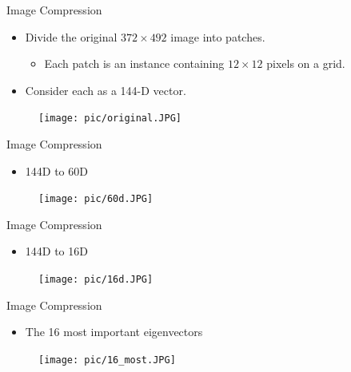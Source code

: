 \documentclass[serif, aspectratio=169]{beamer}
\begin{document}
\begin{frame}{Image Compression}
       \begin{itemize}
           \item Divide the original $372 \times 492$ image into patches.
\begin{itemize}
    \item Each patch is an instance containing $12 \times 12$ pixels on a grid.
\end{itemize}
            \item Consider each as a 144-D vector.
       \end{itemize}
        \begin{figure}[htpb]
            \begin{center}
                \texttt{[image: pic/original.JPG]}
            \end{center}
        \end{figure}
\end{frame}

\begin{frame}{Image Compression}
       \begin{itemize}
           \item 144D to 60D
       \end{itemize}
        \begin{figure}[htpb]
            \begin{center}
                \texttt{[image: pic/60d.JPG]}
            \end{center}
        \end{figure}
\end{frame}

\begin{frame}{Image Compression}
       \begin{itemize}
           \item 144D to 16D
       \end{itemize}
        \begin{figure}[htpb]
            \begin{center}
                \texttt{[image: pic/16d.JPG]}
            \end{center}
        \end{figure}
\end{frame}


\begin{frame}{Image Compression}
       \begin{itemize}
           \item The 16 most important eigenvectors
       \end{itemize}
        \begin{figure}[htpb]
            \begin{center}
                \texttt{[image: pic/16\_most.JPG]}
            \end{center}
        \end{figure}
\end{frame}
\end{document}
